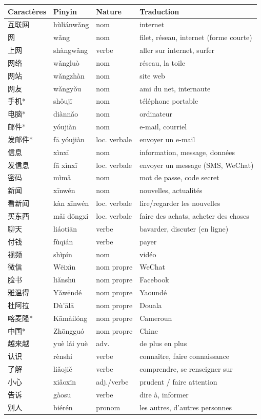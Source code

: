 \documentclass[11pt]{article}
\begin{document}
\begin{center}
\begin{tabularx}{\linewidth}{|X|X|X|X|}
\hline
\rowcolor{popblueL} Caractères & Pinyin & Nature & Traduction \\
\hline
互联网 & hùliánwǎng & nom & internet \\
\hline
网 & wǎng & nom & filet, réseau, internet (forme courte) \\
\hline
上网 & shàngwǎng & verbe & aller sur internet, surfer \\
\hline
网络 & wǎngluò & nom & réseau, la toile \\
\hline
网站 & wǎngzhàn & nom & site web \\
\hline
网友 & wǎngyǒu & nom & ami du net, internaute \\
\hline
手机* & shǒujī & nom & téléphone portable \\
\hline
电脑* & diànnǎo & nom & ordinateur \\
\hline
邮件* & yóujiàn & nom & e-mail, courriel \\
\hline
发邮件* & fā yóujiàn & loc. verbale & envoyer un e-mail \\
\hline
信息 & xìnxī & nom & information, message, données \\
\hline
发信息 & fā xìnxī & loc. verbale & envoyer un message (SMS, WeChat) \\
\hline
密码 & mìmǎ & nom & mot de passe, code secret \\
\hline
新闻 & xīnwén & nom & nouvelles, actualités \\
\hline
看新闻 & kàn xīnwén & loc. verbale & lire/regarder les nouvelles \\
\hline
买东西 & mǎi dōngxi & loc. verbale & faire des achats, acheter des choses \\
\hline
聊天 & liáotiān & verbe & bavarder, discuter (en ligne) \\
\hline
付钱 & fùqián & verbe & payer \\
\hline
视频 & shìpín & nom & vidéo \\
\hline
微信 & Wēixìn & nom propre & WeChat \\
\hline
脸书 & liǎnshū & nom propre & Facebook \\
\hline
雅温得 & Yǎwēndé & nom propre & Yaoundé \\
\hline
杜阿拉 & Dù'ālā & nom propre & Douala \\
\hline
喀麦隆* & Kāmàilóng & nom propre & Cameroun \\
\hline
中国* & Zhōngguó & nom propre & Chine \\
\hline
越来越 & yuè lái yuè & adv. & de plus en plus \\
\hline
认识 & rènshi & verbe & connaître, faire connaissance \\
\hline
了解 & liǎojiě & verbe & comprendre, se renseigner sur \\
\hline
小心 & xiǎoxīn & adj./verbe & prudent / faire attention \\
\hline
告诉 & gàosu & verbe & dire à, informer \\
\hline
别人 & biérén & pronom & les autres, d'autres personnes \\
\hline
\end{tabularx}
\end{center}
\end{document}
